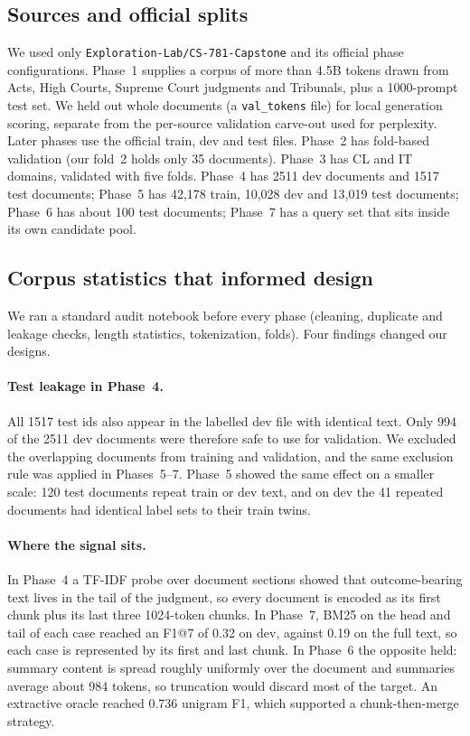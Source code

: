 \documentclass[11pt, oneside]{article}
\begin{document}
\subsection{Sources and official splits}
We used only \texttt{Exploration-Lab/CS-781-Capstone} and its official phase configurations. Phase~1 supplies a corpus of more than 4.5B tokens drawn from Acts, High Courts, Supreme Court judgments and Tribunals, plus a 1000-prompt test set. We held out whole documents (a \texttt{val\_tokens} file) for local generation scoring, separate from the per-source validation carve-out used for perplexity. Later phases use the official train, dev and test files. Phase~2 has fold-based validation (our fold~2 holds only 35 documents). Phase~3 has CL and IT domains, validated with five folds. Phase~4 has 2511 dev documents and 1517 test documents; Phase~5 has 42{,}178 train, 10{,}028 dev and 13{,}019 test documents; Phase~6 has about 100 test documents; Phase~7 has a query set that sits inside its own candidate pool.

\subsection{Corpus statistics that informed design}
We ran a standard audit notebook before every phase (cleaning, duplicate and leakage checks, length statistics, tokenization, folds). Four findings changed our designs.

\paragraph{Test leakage in Phase~4.} All 1517 test ids also appear in the labelled dev file with identical text. Only 994 of the 2511 dev documents were therefore safe to use for validation. We excluded the overlapping documents from training and validation, and the same exclusion rule was applied in Phases~5--7. Phase~5 showed the same effect on a smaller scale: 120 test documents repeat train or dev text, and on dev the 41 repeated documents had identical label sets to their train twins.

\paragraph{Where the signal sits.} In Phase~4 a TF-IDF probe over document sections showed that outcome-bearing text lives in the tail of the judgment, so every document is encoded as its first chunk plus its last three 1024-token chunks. In Phase~7, BM25 on the head and tail of each case reached an F1@7 of 0.32 on dev, against 0.19 on the full text, so each case is represented by its first and last chunk. In Phase~6 the opposite held: summary content is spread roughly uniformly over the document and summaries average about 984 tokens, so truncation would discard most of the target. An extractive oracle reached 0.736 unigram F1, which supported a chunk-then-merge strategy.
\end{document}
